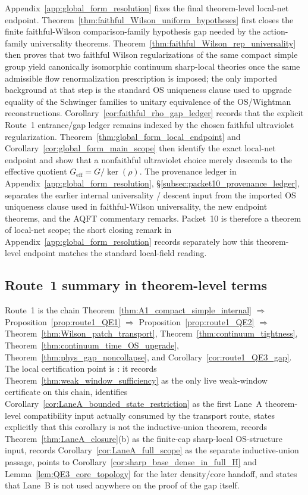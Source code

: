 Appendix~\ref{app:global_form_resolution} fixes the final theorem-level local-net endpoint.
Theorem~\ref{thm:faithful_Wilson_uniform_hypotheses} first closes the finite faithful-Wilson comparison-family hypothesis gap needed by the action-family universality theorems.
Theorem~\ref{thm:faithful_Wilson_rep_universality} then proves that two faithful Wilson regularizations of the same compact simple group yield canonically isomorphic continuum sharp-local theories once the same admissible flow renormalization prescription is imposed; the only imported background at that step is the standard OS uniqueness clause used to upgrade equality of the Schwinger families to unitary equivalence of the OS/Wightman reconstructions.
Corollary~\ref{cor:faithful_rho_gap_ledger} records that the explicit Route~1 entrance/gap ledger remains indexed by the chosen faithful ultraviolet regularization.
Theorem~\ref{thm:global_form_local_endpoint} and Corollary~\ref{cor:global_form_main_scope} then identify the exact local-net endpoint and show that a nonfaithful ultraviolet choice merely descends to the effective quotient $G_{\mathrm{eff}}=G/\ker(\rho)$. The provenance ledger in Appendix~\ref{app:global_form_resolution}, \S\ref{subsec:packet10_provenance_ledger}, separates the earlier internal universality / descent input from the imported OS uniqueness clause used in faithful-Wilson universality, the new endpoint theorems, and the AQFT commentary remarks.
Packet~10 is therefore a theorem of local-net scope; the short closing remark in Appendix~\ref{app:global_form_resolution} records separately how this theorem-level endpoint matches the standard local-field reading.

\subsection{Route~1 summary in theorem-level terms}

Route~1 is the chain Theorem~\ref{thm:A1_compact_simple_internal} $\Longrightarrow$ Proposition~\ref{prop:route1_QE1} $\Longrightarrow$ Proposition~\ref{prop:route1_QE2} $\Longrightarrow$ Theorem~\ref{thm:Wilson_patch_transport}, Theorem~\ref{thm:continuum_tightness}, Theorem~\ref{thm:continuum_time_OS_upgrade}, Theorem~\ref{thm:phys_gap_noncollapse}, and Corollary~\ref{cor:route1_QE3_gap}.
The local certification point is : it records Theorem~\ref{thm:weak_window_sufficiency} as the only live weak-window certificate on this chain, identifies Corollary~\ref{cor:LaneA_bounded_state_restriction} as the first Lane~A theorem-level compatibility input actually consumed by the transport route, states explicitly that this corollary is not the inductive-union theorem, records Theorem~\ref{thm:LaneA_closure}(b) as the finite-cap sharp-local OS-structure input, records Corollary~\ref{cor:LaneA_full_scope} as the separate inductive-union passage, points to Corollary~\ref{cor:sharp_base_dense_in_full_H} and Lemma~\ref{lem:QE3_core_topology} for the later density/core handoff, and states that Lane~B is not used anywhere on the proof of the gap itself.

